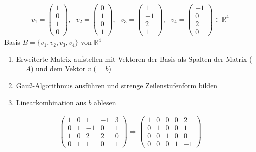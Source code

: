 \documentclass{scrartcl}
\newcommand{\linkToRef}[2][ref]{\hyperref[#1]{\underline{#2}}}
\begin{document}
\begin{align*}
v_1 = \begin{pmatrix} 1 \\ 0 \\ 1\\ 0 \end{pmatrix}, ~~~ v_2 = \begin{pmatrix} 0 \\ 1 \\ 0\\ 1 \end{pmatrix}, ~~~ v_3 = \begin{pmatrix} 1 \\ -1 \\ 2\\ 1 \end{pmatrix}, ~~~ v_4 = \begin{pmatrix} -1 \\ 0 \\ 2\\ 0 \end{pmatrix} \in \mathbb{R}^4
\end{align*}
Basis $B = \{v_1, v_2, v_3, v_4\}$ von $\mathbb{R}^4$\\
\begin{enumerate}
\item Erweiterte Matrix aufstellen mit Vektoren der Basis als Spalten der Matrix ($=A$) und dem Vektor $v$ ($=b$)
\item \linkToRef[Gauss]{Gauß-Algorithmus} ausführen und strenge Zeilenstufenform bilden
\item Linearkombination aus $b$ ablesen
\end{enumerate}


\begin{Beispiel}
\begin{align*}
\left(
\begin{array}{cccc|c}
1 & 0 & 1 & -1 & 3 \\
0 & 1 & -1 & 0 & 1\\
1 & 0 & 2 & 2 & 0\\
0 & 1 & 1 & 0 & 1
\end{array}
\right)
\Rightarrow
\left(
\begin{array}{cccc|c}
1 & 0 & 0 & 0 & 2 \\
0 & 1 & 0 & 0 & 1\\
0 & 0 & 1 & 0 & 0\\
0 & 0 & 0 & 1 & -1
\end{array}
\right)
\end{align*}
\end{Beispiel}
\end{document}
